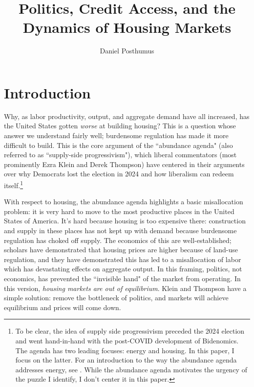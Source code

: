 \documentclass{article}[11pt]
\begin{document}
\title{Politics, Credit Access, and the Dynamics of Housing Markets} 
\author{Daniel Posthumus}

\maketitle

\section{Introduction}
Why, as labor productivity, output, and aggregate demand have all increased, has the United States gotten \textit{worse} at building housing? This is a question whose answer we understand fairly well; burdensome regulation has made it more difficult to build. This is the core argument of the ``abundance agenda" (also referred to as ``supply-side progressivism"), which liberal commentators (most prominently Ezra Klein and Derek Thompson) have centered in their arguments over why Democrats lost the election in 2024 and how liberalism can redeem itself.\footnote{To be clear, the idea of supply side progressivism preceded the 2024 election and went hand-in-hand with the post-COVID development of Bidenomics. The agenda has two leading focuses: energy and housing. In this paper, I focus on the latter. For an introduction to the way the abundance agenda addresses energy, see \citep{cheap2022energy}. While the abundance agenda motivates the urgency of the puzzle I identify, I don't center it in this paper.} \citep{klein2021economic} \citep{kleinthompson}

With respect to housing, the abundance agenda highlights a basic misallocation problem: it is very hard to move to the most productive places in the United States of America. It's hard because housing is too expensive there: construction and supply in these places has not kept up with demand because burdensome regulation has choked off supply. \citep{glaeser2005} \citep{glaeser2005empirical} The economics of this are well-established; scholars have demonstrated that housing prices are higher because of land-use regulation, and they have demonstrated this has led to a misallocation of labor which has devastating effects on aggregate output. \citep{hsieh2019housing} In this framing, politics, not economics, has prevented the ``invisible hand" of the market from operating. In this version, \textit{housing markets are out of equilibrium}. Klein and Thompson have a simple solution: remove the bottleneck of politics, and markets will achieve equilibrium and prices will come down.
\end{document}
